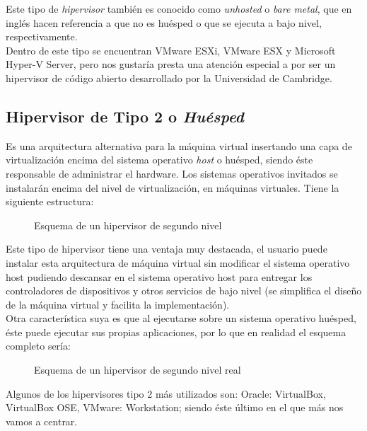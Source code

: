 Este tipo de \emph{hipervisor} también es conocido como \emph{unhosted} o \emph{bare metal}, que en inglés hacen referencia a que no es huésped o que se ejecuta a bajo nivel, respectivamente.\\

Dentro de este tipo se encuentran VMware ESXi, VMware ESX y Microsoft Hyper-V Server, pero nos gustaría presta una atención especial a  por ser un hipervisor de código abierto desarrollado por la Universidad de Cambridge\cite{proyectoxen}\cite{proyectoxen2}.
\subsection{Hipervisor de Tipo 2 o \emph{Huésped}}\label{tiposvir2}
Es una arquitectura alternativa para la máquina virtual insertando una capa de virtualización encima del sistema operativo \emph{host} o huésped, siendo éste responsable de administrar el hardware. Los sistemas operativos invitados se instalarán encima del nivel de virtualización, en máquinas virtuales. Tiene la siguiente estructura:

\begin{figure}[H]
\begin{center}
\end{center}
\caption[Hipervisor Tipo 2]{Esquema de un hipervisor de segundo nivel}
\end{figure}

Este tipo de hipervisor tiene una ventaja muy destacada, el usuario puede instalar esta arquitectura de máquina virtual sin modificar el sistema operativo host pudiendo descansar en el sistema operativo host para entregar los controladores de dispositivos y otros servicios de bajo nivel (se simplifica el diseño de la máquina virtual y facilita la implementación).\\

Otra característica suya es que al ejecutarse sobre un sistema operativo huésped, éste puede ejecutar sus propias aplicaciones, por lo que en realidad el esquema completo sería:

\begin{figure}[H]
\begin{center}
\end{center}
\caption[Hipervisor Tipo 2 final]{Esquema de un hipervisor de segundo nivel real}
\end{figure}

Algunos de los hipervisores tipo 2 más utilizados son: Oracle: VirtualBox, VirtualBox OSE, VMware: Workstation; siendo éste último en el que más nos vamos a centrar.

